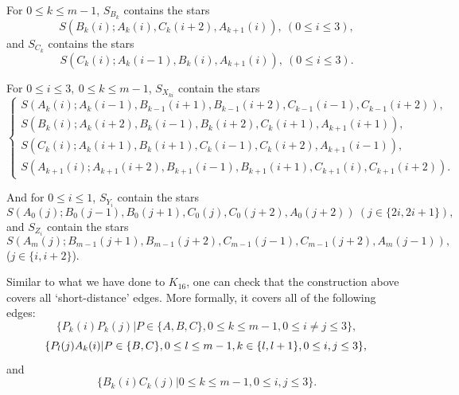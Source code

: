 \documentclass{article}
\begin{document}
For $0\le k\le m-1$, $S_{B_k}$ contains the stars
$$
S (B_k(i); A_k(i), C_k(i+2), A_{k+1}(i) ),~(0\le i\le 3),
$$
and $S_{C_k}$ contains the stars
$$
S (C_k(i); A_k(i-1), B_k(i), A_{k+1}(i) ),~(0\le i\le 3).
$$

For $0\le i\le 3,~0\le k\le m-1$, $S_{X_{ki}}$ contain the stars
\[\begin{cases}
		S (A_k(i); A_k(i-1), B_{k-1}(i+1), B_{k-1}(i+2), C_{k-1}(i-1), C_{k-1}(i+2) ),\\
		S (B_k(i); A_k(i+2), B_k(i-1), B_k(i+2), C_k(i+1), A_{k+1}(i+1) ),\\
		S (C_k(i); A_k(i+1), B_k(i+1), C_k(i-1), C_k(i+2), A_{k+1}(i-1) ),\\
		S (A_{k+1}(i); A_{k+1}(i+2), B_{k+1}(i-1), B_{k+1}(i+1), C_{k+1}(i), C_{k+1}(i+2) ).
\end{cases}\]

And for $0\le i\le 1$, $S_{Y_i}$ contain the stars
$$
S (A_0(j); B_0(j-1), B_0(j+1), C_0(j), C_0(j+2), A_0(j+2) )~(j\in\{2i,2i+1\}),
$$
and $S_{Z_i}$ contain the stars
$$
S (A_m(j); B_{m-1}(j+1), B_{m-1}(j+2), C_{m-1}(j-1), C_{m-1}(j+2), A_m(j-1) ),
$$
($j\in\{i,i+2\}$).
	
Similar to what we have done to $K_{16}$, one can check that the construction above covers all `short-distance' edges. More formally, it covers all of the following edges:
$$
\{P_k(i)P_k(j)|P\in \{A, B, C\}, 0\le k\le m-1, 0\le i\neq j\le 3\},
$$
$$
\{P_l(j)A_k(i)|P\in \{B, C\}, 0\le l\le m-1, k\in\{l, l+1\}, 0\le i,j\le 3\},\\
$$
and
$$
\{B_k(i)C_k(j)|0\le k\le m-1, 0\le i,j\le 3\}.
$$
	
\end{document}
